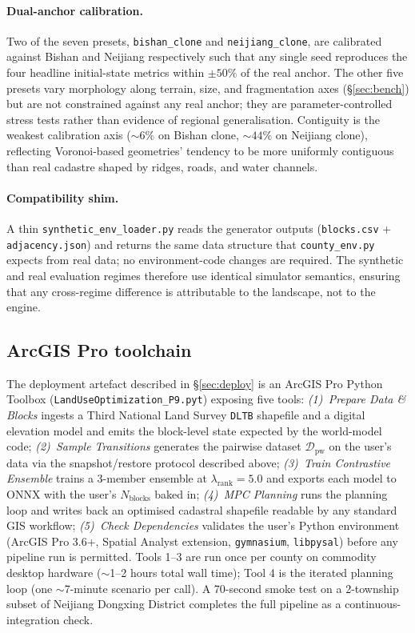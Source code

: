 \documentclass[11pt]{article}
\begin{document}
\paragraph{Dual-anchor calibration.} Two of the seven presets, \texttt{bishan\_clone} and \texttt{neijiang\_clone}, are calibrated against Bishan and Neijiang respectively such that any single seed reproduces the four headline initial-state metrics within $\pm 50\%$ of the real anchor. The other five presets vary morphology along terrain, size, and fragmentation axes (\S\ref{sec:bench}) but are not constrained against any real anchor; they are parameter-controlled stress tests rather than evidence of regional generalisation. Contiguity is the weakest calibration axis ($\sim$$6\%$ on Bishan clone, $\sim$$44\%$ on Neijiang clone), reflecting Voronoi-based geometries' tendency to be more uniformly contiguous than real cadastre shaped by ridges, roads, and water channels.

\paragraph{Compatibility shim.} A thin \texttt{synthetic\_env\_loader.py} reads the generator outputs (\texttt{blocks.csv} + \texttt{adjacency.json}) and returns the same data structure that \texttt{county\_env.py} expects from real data; no environment-code changes are required. The synthetic and real evaluation regimes therefore use identical simulator semantics, ensuring that any cross-regime difference is attributable to the landscape, not to the engine.

\subsection*{ArcGIS Pro toolchain}\label{sec:methods-toolchain}

The deployment artefact described in \S\ref{sec:deploy} is an ArcGIS Pro Python Toolbox (\texttt{LandUseOptimization\_P9.pyt}) exposing five tools: \emph{(1)~Prepare Data \& Blocks} ingests a Third National Land Survey \texttt{DLTB} shapefile and a digital elevation model and emits the block-level state expected by the world-model code; \emph{(2)~Sample Transitions} generates the pairwise dataset $\mathcal{D}_{\text{pw}}$ on the user's data via the snapshot/restore protocol described above; \emph{(3)~Train Contrastive Ensemble} trains a 3-member ensemble at $\lambda_{\text{rank}}{=}5.0$ and exports each model to ONNX with the user's $N_{\text{blocks}}$ baked in; \emph{(4)~MPC Planning} runs the planning loop and writes back an optimised cadastral shapefile readable by any standard GIS workflow; \emph{(5)~Check Dependencies} validates the user's Python environment (ArcGIS Pro 3.6+, Spatial Analyst extension, \texttt{gymnasium}, \texttt{libpysal}) before any pipeline run is permitted. Tools 1--3 are run once per county on commodity desktop hardware ($\sim$1--2 hours total wall time); Tool 4 is the iterated planning loop (one $\sim$7-minute scenario per call). A 70-second smoke test on a 2-township subset of Neijiang Dongxing District completes the full pipeline as a continuous-integration check.
\end{document}
